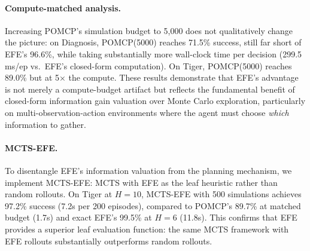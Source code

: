 \documentclass[runningheads]{llncs}
\begin{document}
\paragraph{Compute-matched analysis.} Increasing POMCP's simulation budget to 5{,}000 does not qualitatively change the picture: on Diagnosis, POMCP(5000) reaches 71.5\% success, still far short of EFE's 96.6\%, while taking substantially more wall-clock time per decision (299.5 ms/ep vs.\ EFE's closed-form computation). On Tiger, POMCP(5000) reaches 89.0\% but at 5$\times$ the compute. These results demonstrate that EFE's advantage is not merely a compute-budget artifact but reflects the fundamental benefit of closed-form information gain valuation over Monte Carlo exploration, particularly on multi-observation-action environments where the agent must choose \emph{which} information to gather.

\paragraph{MCTS-EFE.} To disentangle EFE's information valuation from the planning mechanism, we implement MCTS-EFE: MCTS with EFE as the leaf heuristic rather than random rollouts. On Tiger at $H{=}10$, MCTS-EFE with 500 simulations achieves 97.2\% success (7.2s per 200 episodes), compared to POMCP's 89.7\% at matched budget (1.7s) and exact EFE's 99.5\% at $H{=}6$ (11.8s). This confirms that EFE provides a superior leaf evaluation function: the same MCTS framework with EFE rollouts substantially outperforms random rollouts.
\end{document}
